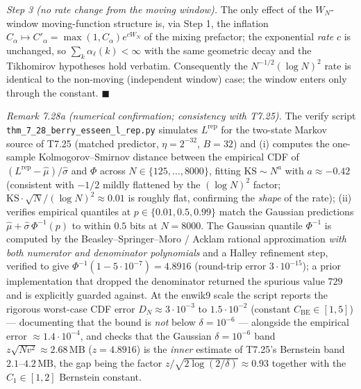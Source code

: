 \documentclass[
]{article}
\begin{document}
\emph{Step 3 (no rate change from the moving window).} The only effect
of the $W_N$-window moving-function structure is, via Step 1, the
inflation $C_\alpha \mapsto C'_\alpha = \max(1,C_\alpha) e^{c W_N}$ of
the mixing prefactor; the exponential \emph{rate} $c$ is unchanged, so
$\sum_k \alpha_\ell(k) < \infty$ with the same geometric decay and the
Tikhomirov hypotheses hold verbatim. Consequently the
$N^{-1/2}(\log N)^2$ rate is identical to the non-moving (independent
window) case; the window enters only through the constant. \hfill
$\blacksquare$

\emph{Remark 7.28a (numerical confirmation; consistency with T7.25).}
The verify script \texttt{thm\_7\_28\_berry\_esseen\_l\_rep.py}
simulates $L^{\mathrm{rep}}$ for the two-state Markov source of T7.25
(matched predictor, $\eta = 2^{-32}$, $B = 32$) and (i) computes the
one-sample Kolmogorov--Smirnov distance between the empirical CDF of
$(L^{\mathrm{rep}} - \hat\mu)/\hat\sigma$ and $\Phi$ across
$N \in \{125, \ldots, 8000\}$, fitting $\mathrm{KS} \sim N^{a}$ with
$a \approx -0.42$ (consistent with $-1/2$ mildly flattened by the
$(\log N)^2$ factor; $\mathrm{KS}\cdot\sqrt{N}/(\log N)^2 \approx 0.01$
is roughly flat, confirming the \emph{shape} of the rate); (ii)
verifies empirical quantiles at $p \in \{0.01, 0.5, 0.99\}$ match the
Gaussian predictions $\hat\mu + \hat\sigma\, \Phi^{-1}(p)$ to within
$0.5$ bits at $N = 8000$. The Gaussian quantile $\Phi^{-1}$ is computed
by the Beasley--Springer--Moro / Acklam rational approximation
\emph{with both numerator and denominator polynomials} and a Halley
refinement step, verified to give $\Phi^{-1}(1 - 5\cdot10^{-7}) =
4.8916$ (round-trip error $3\cdot10^{-15}$); a prior implementation
that dropped the denominator returned the spurious value $729$ and is
explicitly guarded against. At the enwik9 scale the script reports the
rigorous worst-case CDF error $D_N \approx 3\cdot10^{-3}$ to
$1.5\cdot10^{-2}$ (constant $C_{\mathrm{BE}} \in [1,5]$) --- documenting
that the bound is \emph{not} below $\delta = 10^{-6}$ --- alongside the
empirical error $\approx 1.4\cdot10^{-4}$, and checks that the Gaussian
$\delta = 10^{-6}$ band $z\sqrt{N v^2} \approx 2.68\,\mathrm{MB}$
($z = 4.8916$) is the \emph{inner} estimate of T7.25's Bernstein band
$2.1$--$4.2\,\mathrm{MB}$, the gap being the factor
$z / \sqrt{2\log(2/\delta)} \approx 0.93$ together with the
$C_1 \in [1,2]$ Bernstein constant.
\end{document}
